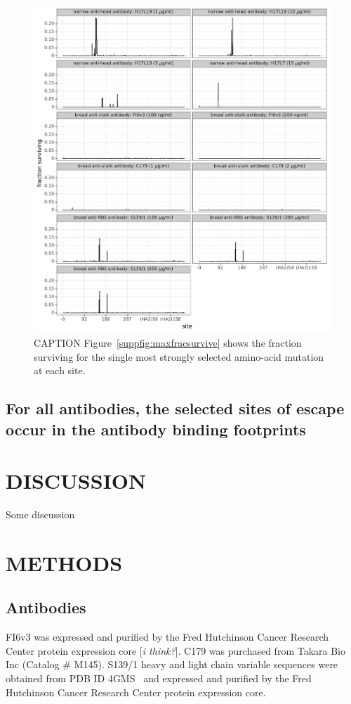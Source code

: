 \documentclass[11pt]{article}
\newcommand{\comment}[1]{{\color{red}[\textsl{#1}]}}
\begin{document}
\begin{figure}
\centerline{\includegraphics[width=\textwidth]{figs/avgfracsurvive.pdf}}
\caption{
\label{fig:avgfracsurvive}
CAPTION
Figure~\ref{suppfig:maxfracsurvive} shows the fraction surviving for the single most strongly selected amino-acid mutation at each site.
}
\end{figure}

\subsection*{For all antibodies, the selected sites of escape occur in the antibody binding footprints}

\section*{DISCUSSION}
Some discussion

\clearpage

\section*{METHODS}
\subsection*{Antibodies}
FI6v3 was expressed and purified by the Fred Hutchinson Cancer Research Center protein expression core \comment{i think?}.
C179 was purchased from Takara Bio Inc (Catalog \# M145).
S139/1 heavy and light chain variable sequences were obtained from PDB ID 4GMS~\cite{lee2012heterosubtypic} and expressed and purified by the Fred Hutchinson Cancer Research Center protein expression core.
\end{document}
